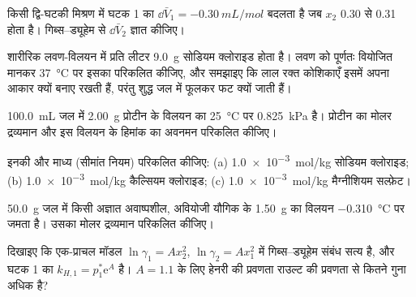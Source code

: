 \begin{exercise}[$\star\star$]\label{exo:b2:chemical-potential:5}
किसी द्वि-घटकी मिश्रण में घटक 1 का 
$\dd\bar V_1 = \qty{-0.30}{mL/mol}$ बदलता है जब $x_2$ 0.30 से 0.31 होता है।
गिब्स--ड्यूहेम से $\dd\bar V_2$ ज्ञात कीजिए।
\end{exercise}

\begin{exercise}[$\star\star$]\label{exo:b2:chemical-potential:6}
शारीरिक लवण-विलयन में प्रति लीटर \qty{9.0}{g} सोडियम क्लोराइड होता है।
लवण को पूर्णतः वियोजित मानकर \qty{37}{\celsius} पर इसका 
परिकलित कीजिए, और समझाइए कि लाल रक्त कोशिकाएँ इसमें अपना आकार क्यों बनाए
रखती हैं, परंतु शुद्ध जल में फूलकर फट क्यों जाती हैं।
\end{exercise}

\begin{exercise}[$\star\star$]\label{exo:b2:chemical-potential:7}
\qty{100.0}{mL} जल में \qty{2.00}{g} प्रोटीन के विलयन का \qty{25}{\celsius} पर
 \qty{0.825}{kPa} है। प्रोटीन का मोलर द्रव्यमान
और इस विलयन के हिमांक का अवनमन परिकलित कीजिए।
\end{exercise}

\begin{exercise}[$\star\star$]\label{exo:b2:chemical-potential:8}
इनकी  और माध्य  (सीमांत नियम)
परिकलित कीजिए: (a) \qty{1.0e-3}{mol/kg} सोडियम क्लोराइड; (b) \qty{1.0e-3}{mol/kg}
कैल्सियम क्लोराइड; (c) \qty{1.0e-3}{mol/kg} मैग्नीशियम सल्फ़ेट।
\end{exercise}

\begin{exercise}[$\star\star$]\label{exo:b2:chemical-potential:9}
\qty{50.0}{g} जल में किसी अज्ञात अवाष्पशील, अवियोजी
यौगिक के \qty{1.50}{g} का विलयन \qty{-0.310}{\celsius} पर जमता है। उसका मोलर
द्रव्यमान परिकलित कीजिए।
\end{exercise}

\begin{exercise}[$\star\star\star$]\label{exo:b2:chemical-potential:10}
दिखाइए कि एक-प्राचल मॉडल $\ln\gamma_1 = Ax_2^2$, $\ln\gamma_2 =
Ax_1^2$ में गिब्स--ड्यूहेम संबंध सत्य है, और घटक 1 का 
$k_{H,1} = p_1^*\mathrm e^A$ है। $A = 1.1$ के लिए हेनरी की प्रवणता
राउल्ट की प्रवणता से कितने गुना अधिक है?
\end{exercise}

